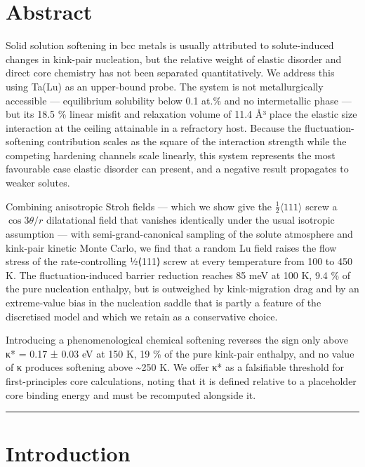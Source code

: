 
\hypertarget{abstract}{%
\section*{Abstract}\label{sec:abstract}}

Solid solution softening in bcc metals is usually attributed to solute-induced changes in kink-pair nucleation, but the relative weight of elastic disorder and direct core chemistry has not been separated quantitatively. We address this using Ta(Lu) as an upper-bound probe. The system is not metallurgically accessible --- equilibrium solubility below 0.1 at.\% and no intermetallic phase --- but its 18.5 \% linear misfit and relaxation volume of 11.4 Å³ place the elastic size interaction at the ceiling attainable in a refractory host. Because the fluctuation-softening contribution scales as the square of the interaction strength while the competing hardening channels scale linearly, this system represents the most favourable case elastic disorder can present, and a negative result propagates to weaker solutes.

Combining anisotropic Stroh fields --- which we show give the \(\tfrac12\langle111\rangle\) screw a \(\cos 3\theta/r\) dilatational field that vanishes identically under the usual isotropic assumption --- with semi-grand-canonical sampling of the solute atmosphere and kink-pair kinetic Monte Carlo, we find that a random Lu field raises the flow stress of the rate-controlling ½⟨111⟩ screw at every temperature from 100 to 450 K. The fluctuation-induced barrier reduction reaches 85 meV at 100 K, 9.4 \% of the pure nucleation enthalpy, but is outweighed by kink-migration drag and by an extreme-value bias in the nucleation saddle that is partly a feature of the discretised model and which we retain as a conservative choice.

Introducing a phenomenological chemical softening reverses the sign only above κ* = 0.17 ± 0.03 eV at 150 K, 19 \% of the pure kink-pair enthalpy, and no value of κ produces softening above \textasciitilde250 K. We offer κ* as a falsifiable threshold for first-principles core calculations, noting that it is defined relative to a placeholder core binding energy and must be recomputed alongside it.

\begin{center}\rule{0.5\linewidth}{0.5pt}\end{center}

\hypertarget{introduction}{%
\section{Introduction}\label{sec:introduction}}

